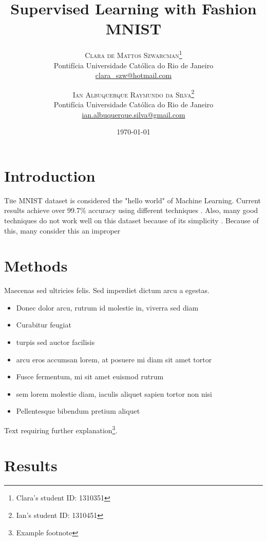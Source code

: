 \documentclass[twoside,twocolumn]{article}
\title{Supervised Learning with Fashion MNIST} %
\author{%
\textsc{Clara de Mattos Szwarcman}\thanks{Clara's student ID: 1310351} \\[1ex] %
\normalsize Pontifícia Universidade Católica do Rio de Janeiro \\ %
\normalsize \href{mailto:clara_szw@hotmail.com}{clara\_szw@hotmail.com} %
\and %
\textsc{Ian Albuquerque Raymundo da Silva}\thanks{Ian's student ID: 1310451} \\[1ex] %
\normalsize Pontifícia Universidade Católica do Rio de Janeiro \\ %
\normalsize \href{mailto:ian.albuquerque.silva@gmail.com}{ian.albuquerque.silva@gmail.com} %
}
\date{\today} %
\begin{document}
\maketitle


\section{Introduction}

\lettrine[nindent=0em,lines=3]{T} he MNIST dataset is considered the "hello world" of Machine Learning.
Current results achieve over 99.7\% accuracy using different techniques
\cite{LWan:2013dg} \cite{DCirean:2012dg} \cite{ISato:2015dg} \cite{JRChang:2015dg} \cite{CYLee:2015dg}.
Also, many good techniques do not work well on this dataset because of its simplicity \cite{CFran:2017dg}.
Because of this, many consider this an improper


\section{Methods}

Maecenas sed ultricies felis. Sed imperdiet dictum arcu a egestas. 
\begin{itemize}
\item Donec dolor arcu, rutrum id molestie in, viverra sed diam
\item Curabitur feugiat
\item turpis sed auctor facilisis
\item arcu eros accumsan lorem, at posuere mi diam sit amet tortor
\item Fusce fermentum, mi sit amet euismod rutrum
\item sem lorem molestie diam, iaculis aliquet sapien tortor non nisi
\item Pellentesque bibendum pretium aliquet
\end{itemize}
\blindtext %

Text requiring further explanation\footnote{Example footnote}.


\section{Results}
\end{document}
